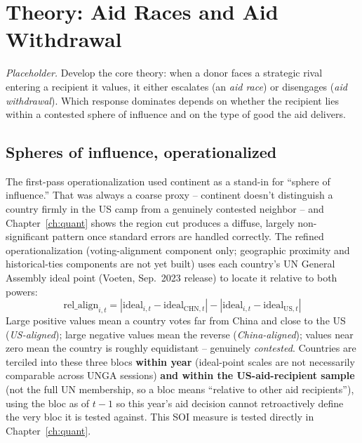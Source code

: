 \chapter{Theory: Aid Races and Aid Withdrawal}
\label{ch:theory}

\textit{Placeholder.} Develop the core theory: when a donor faces a strategic
rival entering a recipient it values, it either escalates (an \emph{aid race})
or disengages (\emph{aid withdrawal}). Which response dominates depends on
whether the recipient lies within a contested sphere of influence and on the
type of good the aid delivers.

\section{Spheres of influence, operationalized}
\label{sec:soi-operational}
The first-pass operationalization used continent as a stand-in for ``sphere of
influence.'' That was always a coarse proxy -- continent doesn't distinguish a
country firmly in the US camp from a genuinely contested neighbor -- and
Chapter~\ref{ch:quant} shows the region cut produces a diffuse, largely
non-significant pattern once standard errors are handled correctly. The
refined operationalization (voting-alignment component only; geographic
proximity and historical-ties components are not yet built) uses each
country's UN General Assembly ideal point (Voeten, Sep.\ 2023 release) to
locate it relative to both powers:
\[
\text{rel\_align}_{i,t} = |\text{ideal}_{i,t} - \text{ideal}_{\text{CHN},t}| - |\text{ideal}_{i,t} - \text{ideal}_{\text{US},t}|
\]
Large positive values mean a country votes far from China and close to the US
(\emph{US-aligned}); large negative values mean the reverse (\emph{China-aligned});
values near zero mean the country is roughly equidistant --
genuinely \emph{contested}. Countries are terciled into these three blocs
\textbf{within year} (ideal-point scales are not necessarily comparable across
UNGA sessions) \textbf{and within the US-aid-recipient sample} (not the full
UN membership, so a bloc means ``relative to other aid recipients''), using
the bloc as of $t-1$ so this year's aid decision cannot
retroactively define the very bloc it is tested against. This SOI measure is
tested directly in Chapter~\ref{ch:quant}.

